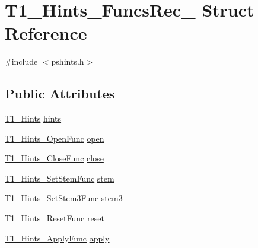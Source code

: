 \hypertarget{struct_t1___hints___funcs_rec__}{\section{T1\-\_\-\-Hints\-\_\-\-Funcs\-Rec\-\_\- Struct Reference}
\label{struct_t1___hints___funcs_rec__}
}


{\ttfamily \#include $<$pshints.\-h$>$}

\subsection*{Public Attributes}
\begin{DoxyCompactItemize}
\item 
\hyperlink{pshints_8h_a86b4b4d3662e7a6eae4dd00eacf88719}{T1\-\_\-\-Hints} \hyperlink{struct_t1___hints___funcs_rec___a6a58f489e362b746703b4caae91349ef}{hints}
\item 
\hyperlink{pshints_8h_a0aacfe03a588f4d5f93a82a5156826e4}{T1\-\_\-\-Hints\-\_\-\-Open\-Func} \hyperlink{struct_t1___hints___funcs_rec___a41ca09a042c8e92f64822f19486a622a}{open}
\item 
\hyperlink{pshints_8h_a9eb6c13bbe475d2d7100ca0441e483c8}{T1\-\_\-\-Hints\-\_\-\-Close\-Func} \hyperlink{struct_t1___hints___funcs_rec___aa6d879215bff42f4b3851a9151c78505}{close}
\item 
\hyperlink{pshints_8h_a0ed3fe9a0f4510bc464a12161c00fe7e}{T1\-\_\-\-Hints\-\_\-\-Set\-Stem\-Func} \hyperlink{struct_t1___hints___funcs_rec___abdbf955a1fc9b19799ed8ea8137c9381}{stem}
\item 
\hyperlink{pshints_8h_a42a08fed4c8f0716c77fd56d8c3f71cf}{T1\-\_\-\-Hints\-\_\-\-Set\-Stem3\-Func} \hyperlink{struct_t1___hints___funcs_rec___acc1edae831d279929f93c8eb1872daa3}{stem3}
\item 
\hyperlink{pshints_8h_a9a0a20816c0cb4b48effc574e9fd9858}{T1\-\_\-\-Hints\-\_\-\-Reset\-Func} \hyperlink{struct_t1___hints___funcs_rec___a5646878cdabd593389e28cffd8b077cb}{reset}
\item 
\hyperlink{pshints_8h_a436e963b0eacf48d04667143f78e86ab}{T1\-\_\-\-Hints\-\_\-\-Apply\-Func} \hyperlink{struct_t1___hints___funcs_rec___a3fb5f01de31da9efb2ae8f5251b4d506}{apply}
\end{DoxyCompactItemize}


